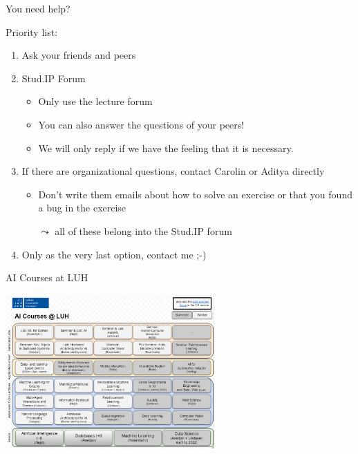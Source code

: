 \documentclass[aspectratio=169]{../latex_main/tntbeamer}  %
\begin{document}
\begin{frame}[c]{You need help?}
	
Priority list:
	\begin{enumerate}
		\item Ask your friends and peers
		\item Stud.IP Forum
		\begin{itemize}
		    \item Only use the lecture forum
			\item You can also answer the questions of your peers! 
			\item We will only reply if we have the feeling that it is necessary.
		\end{itemize}
		\item If there are organizational questions, contact Carolin or Aditya directly 
		\begin{itemize}
		    \item Don't write them emails about how to solve an exercise or that you found a bug in the exercise
		    \item[$\leadsto$] all of these belong into the Stud.IP forum
		\end{itemize}
		\item Only as the very last option, contact me ;-)
	\end{enumerate}
	
\end{frame}
\begin{frame}{AI Courses at LUH}
    
    \centering
    \includegraphics[width=0.6\textwidth]{images/ai_luh.PNG}

\end{frame}
\end{document}
